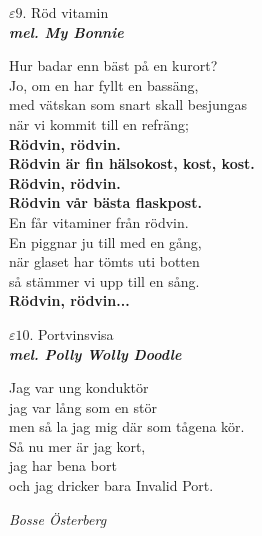 \documentclass[a6paper,10pt]{article}
\newcommand{\mel}[1]{\small\textbf{\textit{mel. #1 \\}}}
\begin{document}
\setlength{\oddsidemargin}{-0.37in}
\noindent
\begin{center}
\Large $\varepsilon9$. Röd vitamin\\ 
\mel{My Bonnie}
\end{center}
Hur badar enn bäst på en kurort?\\
Jo, om en har fyllt en bassäng,\\
med vätskan som snart skall besjungas\\
när vi kommit till en refräng;
\vspace{5pt}\\
\textbf{Rödvin, rödvin.\\
Rödvin är fin hälsokost, kost, kost.\\
Rödvin, rödvin.\\
Rödvin vår bästa flaskpost.}
\vspace{5pt}\\
En får vitaminer från rödvin.\\
En piggnar ju till med en gång,\\
när glaset har tömts uti botten\\
så stämmer vi upp till en sång.
\vspace{5pt}\\
\textbf{Rödvin, rödvin...}
\vspace{30pt}
\begin{center}
\Large $\varepsilon10$. Portvinsvisa\\ 
\mel{Polly Wolly Doodle}
\end{center}
Jag var ung konduktör\\
jag var lång som en stör\\
men så la jag mig där som tågena kör.
\vspace{5pt}\\
Så nu mer är jag kort,\\
jag har bena bort\\
och jag dricker bara Invalid Port.
\begin{flushright}
\textit{Bosse Österberg}
\end{flushright}
\end{document}
